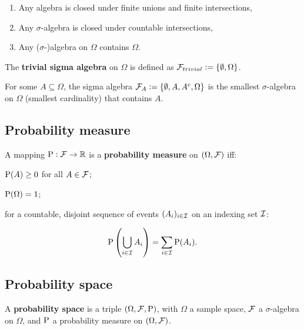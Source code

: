 \begin{remark}
    \begin{enumerate}
        \item Any algebra is closed under finite unions and finite intersections,
        \item Any $\sigma$-algebra is closed under countable intersections,
        \item Any ($\sigma$-)algebra on $\Omega$ contains $\Omega$.
    \end{enumerate}
\end{remark}

\begin{definition}
    The \textbf{trivial sigma algebra} on $\Omega$ is defined as $\FFF_{trivial} := \{ \emptyset, \Omega \}$.
\end{definition}

\begin{example}
    For some $A \subseteq \Omega$, the sigma algebra $\FFF_A := \{\emptyset, A, A^c , \Omega \}$ is the smallest $\sigma$-algebra on $\Omega$ (smallest cardinality) that contains $A$.
\end{example}


\subsection{Probability measure}

\begingroup\belowdisplayskip=-10pt
    \begin{definition}
        A mapping $\P: \FFF \to \RR$ is a \textbf{probability measure} on $(\Omega, \FFF)$ iff:\\
        \begin{enumerate*}
            \item $\P(A)\geq0$ for all $A\in\FFF$;
            \item $\P(\Omega) = 1$;
            \item for a countable, disjoint sequence of events $(A_i)_{i\in\III}$ on an indexing set $\III$: \\
        \end{enumerate*}
        \[
        \P\left(\bigcup_{i\in\III}A_i\right) = \sum_{i\in\III}\P(A_i)\textcolor{black}{.}
        \]
    \end{definition}
\endgroup

\begingroup\abovedisplayskip=-10pt 
\subsection{Probability space}
\endgroup
\begin{definition}
    A \textbf{probability space} is a triple $(\Omega, \FFF, \P)$, with $\Omega$ a sample space, $\FFF$ a $\sigma$-algebra on $\Omega$, and $\P$ a probability measure on $(\Omega, \FFF)$.
\end{definition}

